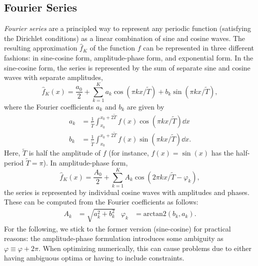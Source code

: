 \subsection{Fourier Series}
    \emph{Fourier series} are a principled way to represent any periodic function (satisfying the Dirichlet conditions\cite{oppenheimSignalsSystems1997}) as a linear combination of sine and cosine waves.
    The resulting approximation $\hat{f}_K$ of the function $f$ can be represented in three different fashions: in sine-cosine form, amplitude-phase form, and exponential form.
    In the sine-cosine form, the series is represented by the sum of separate sine and cosine waves with separate amplitudes,
    \begin{equation}
        \hat{f}_K(x) = \frac{a_0}{2} + \sum_{k = 1}^{K} a_k \cos(\pi k x / \tilde{T}) + b_k \sin(\pi k x / \tilde{T}),
        \label{eq:sineCosineFourierSeries}
    \end{equation}
    where the Fourier coefficients $a_k$ and $b_k$ are given by
    \begin{align}
        a_k &= \frac{1}{\tilde{T}} \int_{x_0}^{x_0 + 2\tilde{T}} f(x) \cos(\pi k x / \tilde{T}) \dd{x} \\
        b_k &= \frac{1}{\tilde{T}} \int_{x_0}^{x_0 + 2\tilde{T}} f(x) \sin(\pi k x / \tilde{T}) \dd{x}.
    \end{align}
    Here, $\tilde{T}$ is half the amplitude of $f$ (for instance, $f(x) = \sin(x)$ has the half-period $\tilde{T} = \pi$).
    In amplitude-phase form,
    \begin{equation}
        \hat{f}_K(x) = \frac{A_0}{2} + \sum_{k = 1}^{K} A_k \cos(2 \pi k x / \tilde{T} - \varphi_k),
    \end{equation}
    the series is represented by individual cosine waves with amplitudes and phases.
    These can be computed from the Fourier coefficients as follows:
    \begin{align}
        A_k &= \sqrt{a_k^2 + b_k^2} &
        \varphi_k &= \mathrm{arctan2}(b_k, a_k).
    \end{align}
    For the following, we stick to the former version (sine-cosine) for practical reasons:
    the amplitude-phase formulation introduces some ambiguity as $\varphi \equiv \varphi + 2\pi$.
    When optimizing numerically, this can cause problems due to either having ambiguous optima or having to include constraints.
